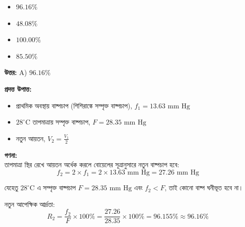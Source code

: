 \documentclass[12pt, a4paper]{article}
\begin{document}
\begin{itemize}[label={}, leftmargin=1cm, itemsep=0.5em]
    \item[\textbf{A)}] $96.16\%$
    \item[\textbf{B)}] $48.08\%$
    \item[\textbf{C)}] $100.00\%$
    \item[\textbf{D)}] $85.50\%$
\end{itemize}

\vspace{0.5em}
\begin{tcolorbox}[answerbox]
    \textbf{\color{success} উত্তর:} A) $96.16\%$
\end{tcolorbox}
\vspace{1em}

\begin{tcolorbox}[solutionbox={সমাধান (Solution)}]
    \noindent
    \textbf{প্রদত্ত উপাত্ত:}
    \begin{itemize}[leftmargin=1.5em, itemsep=0.2em]
        \item প্রাথমিক অবস্থায় বাষ্পচাপ (শিশিরাঙ্কে সম্পৃক্ত বাষ্পচাপ), $f_1 = 13.63\text{ mm Hg}$
        \item $28^\circ\text{C}$ তাপমাত্রায় সম্পৃক্ত বাষ্পচাপ, $F = 28.35\text{ mm Hg}$
        \item নতুন আয়তন, $V_2 = \frac{V_1}{2}$
    \end{itemize}

    \vspace{0.6em}
    \noindent\textbf{গণনা:} \\
    তাপমাত্রা স্থির রেখে আয়তন অর্ধেক করলে বোয়েলের সূত্রানুসারে নতুন বাষ্পচাপ হবে:
    \[ f_2 = 2 \times f_1 = 2 \times 13.63\text{ mm Hg} = 27.26\text{ mm Hg} \]
    
    যেহেতু $28^\circ\text{C}$ এ সম্পৃক্ত বাষ্পচাপ $F = 28.35\text{ mm Hg}$ এবং $f_2 < F$, তাই কোনো বাষ্প ঘনীভূত হবে না।
    
    \vspace{0.4em}
    নতুন আপেক্ষিক আর্দ্রতা:
    \[ R_2 = \frac{f_2}{F} \times 100\% = \frac{27.26}{28.35} \times 100\% = 96.155\% \approx \mathbf{96.16\%} \]
\end{tcolorbox}
\end{document}
